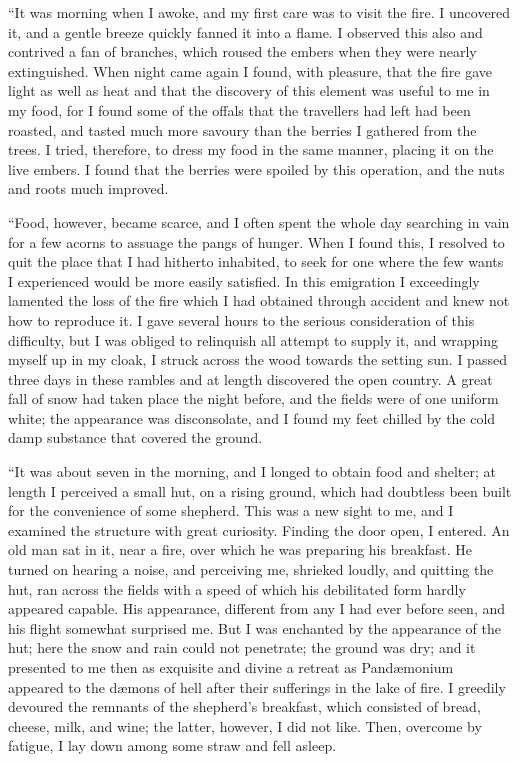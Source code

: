 \documentclass[12pt,openright]{book}
\begin{document}
“It was morning when I awoke, and my first care was to visit the fire. I uncovered it, and a gentle breeze quickly fanned it into a flame. I observed this also and contrived a fan of branches, which roused the embers when they were nearly extinguished. When night came again I found, with pleasure, that the fire gave light as well as heat and that the discovery of this element was useful to me in my food, for I found some of the offals that the travellers had left had been roasted, and tasted much more savoury than the berries I gathered from the trees. I tried, therefore, to dress my food in the same manner, placing it on the live embers. I found that the berries were spoiled by this operation, and the nuts and roots much improved.

“Food, however, became scarce, and I often spent the whole day searching in vain for a few acorns to assuage the pangs of hunger. When I found this, I resolved to quit the place that I had hitherto inhabited, to seek for one where the few wants I experienced would be more easily satisfied. In this emigration I exceedingly lamented the loss of the fire which I had obtained through accident and knew not how to reproduce it. I gave several hours to the serious consideration of this difficulty, but I was obliged to relinquish all attempt to supply it, and wrapping myself up in my cloak, I struck across the wood towards the setting sun. I passed three days in these rambles and at length discovered the open country. A great fall of snow had taken place the night before, and the fields were of one uniform white; the appearance was disconsolate, and I found my feet chilled by the cold damp substance that covered the ground.

“It was about seven in the morning, and I longed to obtain food and shelter; at length I perceived a small hut, on a rising ground, which had doubtless been built for the convenience of some shepherd. This was a new sight to me, and I examined the structure with great curiosity. Finding the door open, I entered. An old man sat in it, near a fire, over which he was preparing his breakfast. He turned on hearing a noise, and perceiving me, shrieked loudly, and quitting the hut, ran across the fields with a speed of which his debilitated form hardly appeared capable. His appearance, different from any I had ever before seen, and his flight somewhat surprised me. But I was enchanted by the appearance of the hut; here the snow and rain could not penetrate; the ground was dry; and it presented to me then as exquisite and divine a retreat as Pandæmonium appeared to the dæmons of hell after their sufferings in the lake of fire. I greedily devoured the remnants of the shepherd’s breakfast, which consisted of bread, cheese, milk, and wine; the latter, however, I did not like. Then, overcome by fatigue, I lay down among some straw and fell asleep.
\end{document}
